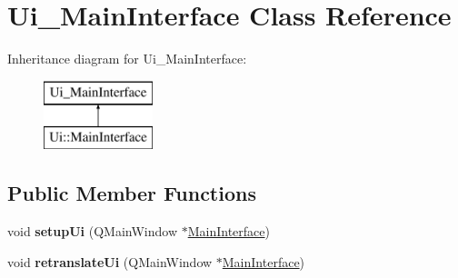 \hypertarget{class_ui___main_interface}{}\section{Ui\+\_\+\+Main\+Interface Class Reference}
\label{class_ui___main_interface}
Inheritance diagram for Ui\+\_\+\+Main\+Interface\+:\begin{figure}[H]
\begin{center}
\leavevmode
\includegraphics[height=2.000000cm]{class_ui___main_interface}
\end{center}
\end{figure}
\subsection*{Public Member Functions}
\begin{DoxyCompactItemize}
\item 
\mbox{\label{class_ui___main_interface_aa8c09ad8ab5464eed7fe57eb946de29e}} 
void {\bfseries setup\+Ui} (Q\+Main\+Window $\ast$\hyperlink{class_main_interface}{Main\+Interface})
\item 
\mbox{\label{class_ui___main_interface_a6650721ee7cf20dc3178cd34048985ad}} 
void {\bfseries retranslate\+Ui} (Q\+Main\+Window $\ast$\hyperlink{class_main_interface}{Main\+Interface})
\end{DoxyCompactItemize}
